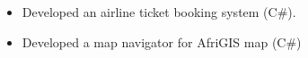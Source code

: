 \divider

\begin{itemize}
	\item Developed an airline ticket booking system (C\#).
\end{itemize}


\divider

\begin{itemize}
	\item Developed a map navigator for AfriGIS map (C\#)
\end{itemize}



\cvproject{}